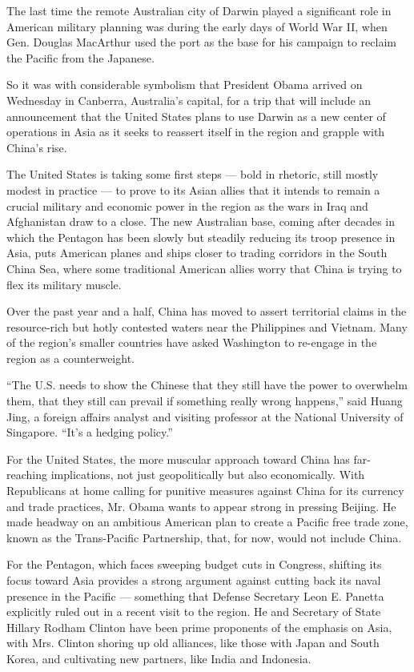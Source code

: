 The last time the remote Australian city of Darwin played a significant
role in American military planning was during the early days of World
War II, when Gen. Douglas MacArthur used the port as the base for his
campaign to reclaim the Pacific from the Japanese.

So it was with considerable symbolism that President Obama arrived on
Wednesday in Canberra, Australia's capital, for a trip that will include
an announcement that the United States plans to use Darwin as a new
center of operations in Asia as it seeks to reassert itself in the
region and grapple with China's rise.

The United States is taking some first steps --- bold in rhetoric, still
mostly modest in practice --- to prove to its Asian allies that it
intends to remain a crucial military and economic power in the region as
the wars in Iraq and Afghanistan draw to a close. The new Australian
base, coming after decades in which the Pentagon has been slowly but
steadily reducing its troop presence in Asia, puts American planes and
ships closer to trading corridors in the South China Sea, where some
traditional American allies worry that China is trying to flex its
military muscle.

Over the past year and a half, China has moved to assert territorial
claims in the resource-rich but hotly contested waters near the
Philippines and Vietnam. Many of the region's smaller countries have
asked Washington to re-engage in the region as a counterweight.

``The U.S. needs to show the Chinese that they still have the power to
overwhelm them, that they still can prevail if something really wrong
happens,'' said Huang Jing, a foreign affairs analyst and visiting
professor at the National University of Singapore. ``It's a hedging
policy.''

For the United States, the more muscular approach toward China has
far-reaching implications, not just geopolitically but also
economically. With Republicans at home calling for punitive measures
against China for its currency and trade practices, Mr. Obama wants to
appear strong in pressing Beijing. He made headway on an ambitious
American plan to create a Pacific free trade zone, known as the
Trans-Pacific Partnership, that, for now, would not include China.

For the Pentagon, which faces sweeping budget cuts in Congress, shifting
its focus toward Asia provides a strong argument against cutting back
its naval presence in the Pacific --- something that Defense Secretary
Leon E. Panetta explicitly ruled out in a recent visit to the region. He
and Secretary of State Hillary Rodham Clinton have been prime proponents
of the emphasis on Asia, with Mrs. Clinton shoring up old alliances,
like those with Japan and South Korea, and cultivating new partners,
like India and Indonesia.

